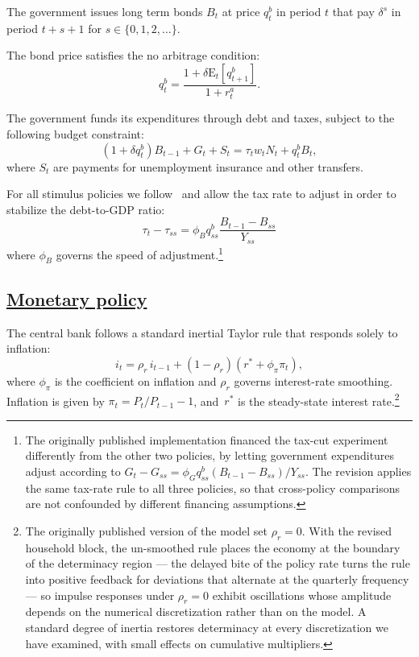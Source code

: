 \documentclass[\latexroot/\projectname]{subfiles}
\begin{document}
The government issues long term bonds $B_{t}$ at price $q^{b}_{t}$ in period $t$ that pay $\delta^{s}$ in period $t+s+1$ for $s \in \{0,1,2,\ldots\}$.

The bond price satisfies the no arbitrage condition:
\[
  q^{b}_{t} = \frac{ 1  + \delta \mathrm{E}_{t}[q^{b}_{t+1}]}{1+r^{a}_{t}}.
\]

The government funds its expenditures through debt and taxes, subject to the following budget constraint:
\[
  (1 + \delta q^{b}_{t})B_{t-1} + G_{t}  + S_{t} = \tau_{t} w_{t} N_{t}+ q^{b}_{t}B_{t},
\]
where $S_{t}$ are payments for unemployment insurance and other transfers.

For all stimulus policies we follow~\cite{arsJumpsHumps} and allow the tax rate to adjust in order to stabilize the debt-to-GDP ratio:
\[
  \tau_{t} - \tau_{ss} = \phi_{B} q^{b}_{ss} \frac{B_{t-1} - B_{ss} }{Y_{ss}}
\]
where $\phi_{B}$ governs the speed of adjustment.\footnote{The originally published implementation financed the tax-cut experiment differently from the other two policies, by letting government expenditures adjust according to $G_{t} - G_{ss} = \phi_{G} q^{b}_{ss} \left(B_{t-1} - B_{ss}\right)/Y_{ss}$. The revision applies the same tax-rate rule to all three policies, so that cross-policy comparisons are not confounded by different financing assumptions.}

\subsection{\href{\WebBase\#sec:hank-monetary-policy}{Monetary policy}}\whenintegrated{\label{sec:hank-monetary-policy}}

The central bank follows a standard inertial Taylor rule that responds solely to inflation:
\[
  i_{t} = \rho_{r}\, i_{t-1} + \left(1-\rho_{r}\right)\left( r^{*} +\phi_{\pi} \pi_{t} \right),
\]
where $\phi_{\pi}$ is the coefficient on inflation and $\rho_{r}$ governs interest-rate smoothing. Inflation is given by $\pi_t = P_t/P_{t-1}-1$, and~$r^{*}$ is the steady-state interest rate.\footnote{The originally published version of the model set $\rho_{r}=0$. With the revised household block, the un-smoothed rule places the economy at the boundary of the determinacy region — the delayed bite of the policy rate turns the rule into positive feedback for deviations that alternate at the quarterly frequency — so impulse responses under $\rho_{r}=0$ exhibit oscillations whose amplitude depends on the numerical discretization rather than on the model. A standard degree of inertia restores determinacy at every discretization we have examined, with small effects on cumulative multipliers.}
\end{document}
